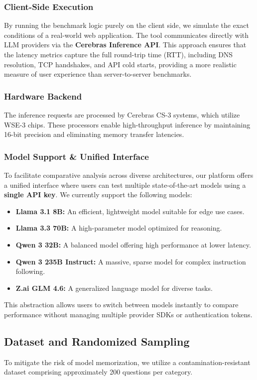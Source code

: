 \documentclass[10pt, twocolumn, a4paper]{article}
\begin{document}
\subsubsection{Client-Side Execution}
By running the benchmark logic purely on the client side, we simulate the exact conditions of a real-world web application. The tool communicates directly with LLM providers via the \textbf{Cerebras Inference API}. This approach ensures that the latency metrics capture the full round-trip time (RTT), including DNS resolution, TCP handshakes, and API cold starts, providing a more realistic measure of user experience than server-to-server benchmarks.

\subsubsection{Hardware Backend}
The inference requests are processed by Cerebras CS-3 systems, which utilize WSE-3 chips. These processors enable high-throughput inference by maintaining 16-bit precision and eliminating memory transfer latencies.

\subsubsection{Model Support \& Unified Interface}
To facilitate comparative analysis across diverse architectures, our platform offers a unified interface where users can test multiple state-of-the-art models using a \textbf{single API key}. We currently support the following models:
\begin{itemize}
    \item \textbf{Llama 3.1 8B:} An efficient, lightweight model suitable for edge use cases.
    \item \textbf{Llama 3.3 70B:} A high-parameter model optimized for reasoning.
    \item \textbf{Qwen 3 32B:} A balanced model offering high performance at lower latency.
    \item \textbf{Qwen 3 235B Instruct:} A massive, sparse model for complex instruction following.
    \item \textbf{Z.ai GLM 4.6:} A generalized language model for diverse tasks.
\end{itemize}
This abstraction allows users to switch between models instantly to compare performance without managing multiple provider SDKs or authentication tokens.

\subsection{Dataset and Randomized Sampling}
To mitigate the risk of model memorization, we utilize a contamination-resistant dataset comprising approximately 200 questions per category.
\end{document}
